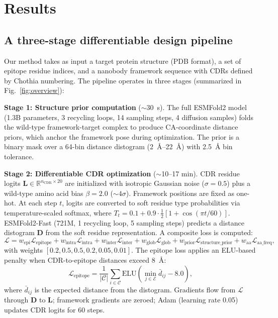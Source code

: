 \documentclass[11pt,a4paper]{article}
\begin{document}
\section{Results}

\subsection{A three-stage differentiable design pipeline}

Our method takes as input a target protein structure (PDB format), a set of epitope residue indices, and a nanobody framework sequence with CDRs defined by Chothia numbering. The pipeline operates in three stages (summarized in Fig.\ \ref{fig:overview}):

\textbf{Stage 1: Structure prior computation} ($\sim$\SI{30}{\second}). The full ESMFold2 model (1.3B parameters, 3 recycling loops, 14 sampling steps, 4 diffusion samples) folds the wild-type framework-target complex to produce CA-coordinate distance priors, which anchor the framework pose during optimization. The prior is a binary mask over a 64-bin distance distogram (\SIrange{2}{22}{\AA}) with \SI{2.5}{\AA} bin tolerance.

\textbf{Stage 2: Differentiable CDR optimization} ($\sim$10--17 min). CDR residue logits $\mathbf{L} \in \mathbb{R}^{n_\text{CDR} \times 20}$ are initialized with isotropic Gaussian noise ($\sigma = 0.5$) plus a wild-type amino acid bias $\beta = 2.0$ ($\sim 4\sigma$). Framework positions are fixed as one-hot. At each step $t$, logits are converted to soft residue type probabilities via temperature-scaled softmax, where $T_t = 0.1 + 0.9 \cdot \frac{1}{2}[1 + \cos(\pi t/60)]$. ESMFold2-Fast (721M, 1 recycling loop, 5 sampling steps) predicts a distance distogram $\mathbf{D}$ from the soft residue representation. A composite loss is computed:
\begin{equation}
\mathcal{L} = w_\text{epi}\mathcal{L}_\text{epitope} + w_\text{intra}\mathcal{L}_\text{intra} + w_\text{inter}\mathcal{L}_\text{inter} + w_\text{glob}\mathcal{L}_\text{glob} + w_\text{prior}\mathcal{L}_\text{structure\_prior} + w_\text{aa}\mathcal{L}_\text{aa\_freq},
\end{equation}
with weights $[0.2, 0.5, 0.5, 0.2, 0.05, 0.01]$. The epitope loss applies an ELU-based penalty when CDR-to-epitope distances exceed \SI{8}{\AA}:
\begin{equation}
\mathcal{L}_\text{epitope} = \frac{1}{|\mathcal{C}|}\sum_{i\in\mathcal{C}} \text{ELU}\!\left(\min_{j\in\mathcal{E}} \bar{d}_{ij} - 8.0\right),
\end{equation}
where $\bar{d}_{ij}$ is the expected distance from the distogram. Gradients flow from $\mathcal{L}$ through $\mathbf{D}$ to $\mathbf{L}$; framework gradients are zeroed; Adam (learning rate \num{0.05}) updates CDR logits for 60 steps.
\end{document}
